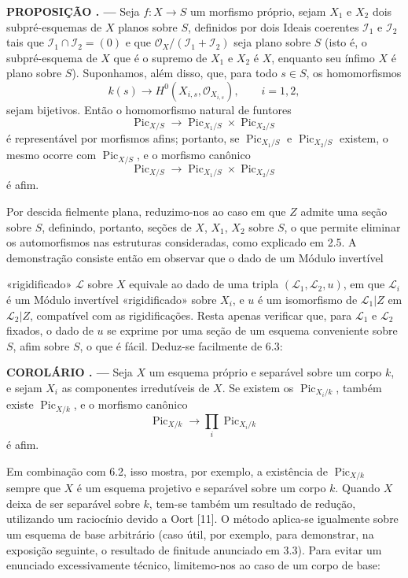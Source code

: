 \documentclass[11pt,twoside,openany]{book}
\numberwithin{equation}{section}
\newcommand{\src}[1]{%
  \phantomsection\hypertarget{src:#1}{}%
  \marginpar{\raggedleft\footnotesize\sffamily #1}%
}
\theoremstyle{plain}
\theoremstyle{definition}
\theoremstyle{remark}
\newcommand{\result}[2]{%
  \par\medskip\noindent\textbf{#1%
  \if\relax\detokenize{#2}\relax\else\space#2\fi. ---}\enspace
}
\newcommand{\FgaUnitKey}{frontmatter}
\renewcommand{\src}[1]{%
  \phantomsection\hypertarget{src:\FgaUnitKey:#1}{}%
  \marginpar{\raggedleft\footnotesize\sffamily #1}%
}
\begin{document}
\result{PROPOSIÇÃO}{6.3} Seja $f:X\longrightarrow S$ um morfismo próprio, sejam
$X_1$ e $X_2$ dois subpré-esquemas de $X$ planos sobre $S$, definidos por dois
Ideais coerentes $\mathcal I_1$ e $\mathcal I_2$ tais que
$\mathcal I_1\cap\mathcal I_2=(0)$ e que
$\mathcal O_X/(\mathcal I_1+\mathcal I_2)$ seja plano sobre $S$ (isto é, o
subpré-esquema de $X$ que é o supremo de $X_1$ e $X_2$ é $X$, enquanto seu ínfimo $X$
é plano sobre $S$).
 Suponhamos, além disso, que, para todo $s\in S$, os
homomorfismos
\[
k(s)\longrightarrow H^0(X_{i,s},\mathcal O_{X_{i,s}}),\qquad i=1,2,
\]
sejam bijetivos. Então o homomorfismo natural de funtores
\[
\operatorname{Pic}_{X/S}\longrightarrow
\operatorname{Pic}_{X_1/S}\times\operatorname{Pic}_{X_2/S}
\]
é representável por morfismos afins; portanto, se
$\operatorname{Pic}_{X_1/S}$ e $\operatorname{Pic}_{X_2/S}$ existem, o mesmo
ocorre com $\operatorname{Pic}_{X/S}$, e o morfismo canônico
\[
\operatorname{Pic}_{X/S}\longrightarrow
\operatorname{Pic}_{X_1/S}\times\operatorname{Pic}_{X_2/S}
\]
é afim.

Por descida fielmente plana, reduzimo-nos ao caso em que $Z$ admite uma seção
sobre $S$, definindo, portanto, seções de $X$, $X_1$, $X_2$ sobre $S$, o que
permite eliminar os automorfismos nas estruturas consideradas, como explicado
em 2.5. A demonstração consiste então em observar que o dado de um Módulo
invertível
\src{159}
«rigidificado» $\mathcal L$ sobre $X$ equivale ao dado de uma tripla
$(\mathcal L_1,\mathcal L_2,u)$, em que $\mathcal L_i$ é um Módulo invertível
«rigidificado» sobre $X_i$, e $u$ é um isomorfismo de
$\mathcal L_1|Z$ em $\mathcal L_2|Z$, compatível com as rigidificações.
Resta apenas verificar que, para $\mathcal L_1$ e $\mathcal L_2$ fixados, o
dado de $u$ se exprime por uma seção de um esquema conveniente sobre $S$, afim
sobre $S$, o que é fácil. Deduz-se facilmente de 6.3:

\result{COROLÁRIO}{6.4} Seja $X$ um esquema próprio e separável sobre um corpo
$k$, e sejam $X_i$ as componentes irredutíveis de $X$. Se existem os
$\operatorname{Pic}_{X_i/k}$, também existe $\operatorname{Pic}_{X/k}$, e o
morfismo canônico
\[
\operatorname{Pic}_{X/k}\longrightarrow\prod_i\operatorname{Pic}_{X_i/k}
\]
é afim.

Em combinação com 6.2, isso mostra, por exemplo, a existência de
$\operatorname{Pic}_{X/k}$ sempre que $X$ é um esquema projetivo e separável
sobre um corpo $k$. Quando $X$ deixa de ser separável sobre $k$, tem-se também
um resultado de redução, utilizando um raciocínio devido a Oort [11]. O método
aplica-se igualmente sobre um esquema de base arbitrário (caso útil, por
exemplo, para demonstrar, na exposição seguinte, o resultado de finitude
anunciado em 3.3). Para evitar um enunciado excessivamente técnico,
limitemo-nos ao caso de um corpo de base:
\end{document}
